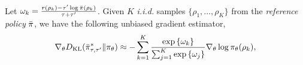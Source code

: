 \begin{thm}
\label{thm:repmdgradientestimate}
Let $\omega_k = \frac{r(\rho_k) - \tau^{\prime} \log{\bar{\pi}(\rho_k)} }{\tau + \tau^{\prime}}$. Given $K$ \emph{i.i.d.} samples $\{\rho_1, \dots, \rho_K\}$ from the \emph{reference policy} $\bar{\pi}$, we have the following unbiased gradient estimator,
\begin{equation}
\label{eq:gradient_estimator}
	\nabla_{\theta} D_{\mathrm{KL}}(\bar{\pi}_{\tau,\tau^{\prime}}^* \| \pi_\theta)\approx -\sum\limits_{k=1}^K{ \frac{ \exp\left\{ \omega_k \right\} }{ \sum_{j=1}^K{ \exp\left\{ \omega_j \right\}}} \nabla_{\theta} \log{\pi_\theta(\rho_k)} },
\end{equation}
\end{thm}














